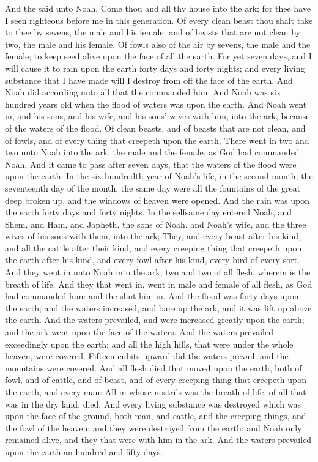 \begin{biblechapter} %
\verse And the \LORD said unto Noah, Come thou and all thy house into the ark; for thee have I seen righteous before me in this generation.
\verse Of every clean beast thou shalt take to thee by sevens, the male and his female: and of beasts that are not clean by two, the male and his female.
\verse Of fowls also of the air by sevens, the male and the female; to keep seed alive upon the face of all the earth.
\verse For yet seven days, and I will cause it to rain upon the earth forty days and forty nights; and every living substance that I have made will I destroy from off the face of the earth.
\verse And Noah did according unto all that the \LORD commanded him.
\verse And Noah was six hundred years old when the flood of waters was upon the earth.
\verse And Noah went in, and his sons, and his wife, and his sons' wives with him, into the ark, because of the waters of the flood.
\verse Of clean beasts, and of beasts that are not clean, and of fowls, and of every thing that creepeth upon the earth,
\verse There went in two and two unto Noah into the ark, the male and the female, as God had commanded Noah.
\verse And it came to pass after seven days, that the waters of the flood were upon the earth.
\verse In the six hundredth year of Noah's life, in the second month, the seventeenth day of the month, the same day were all the fountains of the great deep broken up, and the windows of heaven were opened.
\verse And the rain was upon the earth forty days and forty nights.
\verse In the selfsame day entered Noah, and Shem, and Ham, and Japheth, the sons of Noah, and Noah's wife, and the three wives of his sons with them, into the ark;
\verse They, and every beast after his kind, and all the cattle after their kind, and every creeping thing that creepeth upon the earth after his kind, and every fowl after his kind, every bird of every sort.
\verse And they went in unto Noah into the ark, two and two of all flesh, wherein is the breath of life.
\verse And they that went in, went in male and female of all flesh, as God had commanded him: and the \LORD shut him in.
\verse And the flood was forty days upon the earth; and the waters increased, and bare up the ark, and it was lift up above the earth.
\verse And the waters prevailed, and were increased greatly upon the earth; and the ark went upon the face of the waters.
\verse And the waters prevailed exceedingly upon the earth; and all the high hills, that were under the whole heaven, were covered.
\verse Fifteen cubits upward did the waters prevail; and the mountains were covered.
\verse And all flesh died that moved upon the earth, both of fowl, and of cattle, and of beast, and of every creeping thing that creepeth upon the earth, and every man:
\verse All in whose nostrils was the breath of life, of all that was in the dry land, died.
\verse And every living substance was destroyed which was upon the face of the ground, both man, and cattle, and the creeping things, and the fowl of the heaven; and they were destroyed from the earth: and Noah only remained alive, and they that were with him in the ark.
\verse And the waters prevailed upon the earth an hundred and fifty days.
\end{biblechapter}

